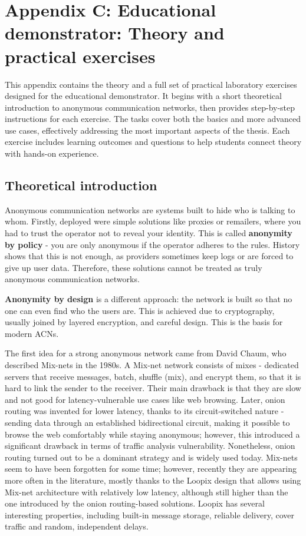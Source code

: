\chapter*{Appendix C: Educational demonstrator: Theory and practical exercises}
\label{chap:AppendixC}

This appendix contains the theory and a full set of practical laboratory exercises designed for the educational demonstrator. It begins with a short theoretical introduction to anonymous communication networks, then provides step-by-step instructions for each exercise. The tasks cover both the basics and more advanced use cases, effectively addressing the most important aspects of the thesis. Each exercise includes learning outcomes and questions to help students connect theory with hands-on experience.

\section*{Theoretical introduction}
Anonymous communication networks are systems built to hide who is talking to whom. Firstly, deployed were simple solutions like proxies or remailers, where you had to trust the operator not to reveal your identity. This is called \textbf{anonymity by policy} - you are only anonymous if the operator adheres to the rules. History shows that this is not enough, as providers sometimes keep logs or are forced to give up user data. Therefore, these solutions cannot be treated as truly anonymous communication networks.

\textbf{Anonymity by design} is a different approach: the network is built so that no one can even find who the users are. This is achieved due to cryptography, usually joined by layered encryption, and careful design. This is the basis for modern ACNs.

The first idea for a strong anonymous network came from David Chaum, who described Mix-nets in the 1980s. A Mix-net network consists of mixes - dedicated servers that receive messages, batch, shuffle (mix), and encrypt them, so that it is hard to link the sender to the receiver. Their main drawback is that they are slow and not good for latency-vulnerable use cases like web browsing. Later, onion routing was invented for lower latency, thanks to its circuit-switched nature - sending data through an established bidirectional circuit, making it possible to browse the web comfortably while staying anonymous; however, this introduced a significant drawback in terms of traffic analysis vulnerability. Nonetheless, onion routing turned out to be a dominant strategy and is widely used today. Mix-nets seem to have been forgotten for some time; however, recently they are appearing more often in the literature, mostly thanks to the Loopix design that allows using Mix-net architecture with relatively low latency, although still higher than the one introduced by the onion routing-based solutions. Loopix has several interesting properties, including built-in message storage, reliable delivery, cover traffic and random, independent delays.

